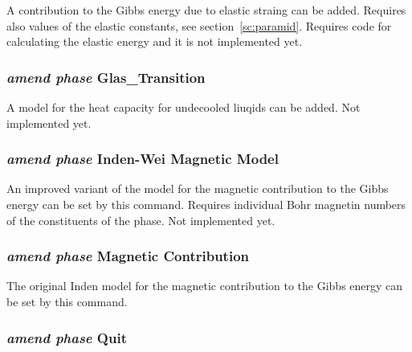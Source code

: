 \documentclass[12pt]{article}
\begin{document}
A contribution to the Gibbs energy due to elastic straing can be
added.  Requires also values of the elastic constants, see
section~\ref{sc:paramid}.  Requires code for calculating the
elastic energy and it is not implemented yet.

\subsubsection{{\em amend phase} Glas\_Transition}

A model for the heat capacity for undecooled liuqids can be added.
Not implemented yet.

\subsubsection{{\em amend phase} Inden-Wei Magnetic Model}

An improved variant of the model for the magnetic contribution to the
Gibbs energy can be set by this command.  Requires individual Bohr
magnetin numbers of the constituents of the phase.  Not implemented
yet.

\subsubsection{{\em amend phase} Magnetic Contribution}

The original Inden model for the magnetic contribution to the Gibbs
energy can be set by this command.

\subsubsection{{\em amend phase} Quit}
\end{document}
